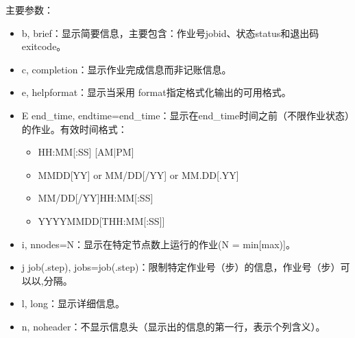 \documentclass[a4paper,12pt,english]{sphinxmanual}
\begin{document}
\sphinxAtStartPar
主要参数：
\begin{itemize}
\item {} 
\sphinxAtStartPar
\sphinxhyphen{}b, \sphinxhyphen{}\sphinxhyphen{}brief：显示简要信息，主要包含：作业号jobid、状态status和退出码exitcode。

\item {} 
\sphinxAtStartPar
\sphinxhyphen{}c, \sphinxhyphen{}\sphinxhyphen{}completion：显示作业完成信息而非记账信息。

\item {} 
\sphinxAtStartPar
\sphinxhyphen{}e, \sphinxhyphen{}\sphinxhyphen{}helpformat：显示当采用 \sphinxhyphen{}\sphinxhyphen{}format指定格式化输出的可用格式。

\item {} 
\sphinxAtStartPar
\sphinxhyphen{}E end\_time, \sphinxhyphen{}\sphinxhyphen{}endtime=end\_time：显示在end\_time时间之前（不限作业状态）的作业。有效时间格式：
\begin{itemize}
\item {} 
\sphinxAtStartPar
HH:MM{[}:SS{]} {[}AM|PM{]}

\item {} 
\sphinxAtStartPar
MMDD{[}YY{]} or MM/DD{[}/YY{]} or MM.DD{[}.YY{]}

\item {} 
\sphinxAtStartPar
MM/DD{[}/YY{]}\sphinxhyphen{}HH:MM{[}:SS{]}

\item {} 
\sphinxAtStartPar
YYYY\sphinxhyphen{}MM\sphinxhyphen{}DD{[}THH:MM{[}:SS{]}{]}

\end{itemize}

\item {} 
\sphinxAtStartPar
\sphinxhyphen{}i, \sphinxhyphen{}\sphinxhyphen{}nnodes=N：显示在特定节点数上运行的作业(N = min{[}\sphinxhyphen{}max){]}。

\item {} 
\sphinxAtStartPar
\sphinxhyphen{}j job(.step), \sphinxhyphen{}\sphinxhyphen{}jobs=job(.step)：限制特定作业号（步）的信息，作业号（步）可以以,分隔。

\item {} 
\sphinxAtStartPar
\sphinxhyphen{}l, \sphinxhyphen{}\sphinxhyphen{}long：显示详细信息。

\item {} 
\sphinxAtStartPar
\sphinxhyphen{}n, \sphinxhyphen{}\sphinxhyphen{}noheader：不显示信息头（显示出的信息的第一行，表示个列含义）。


\end{itemize}
\end{document}
